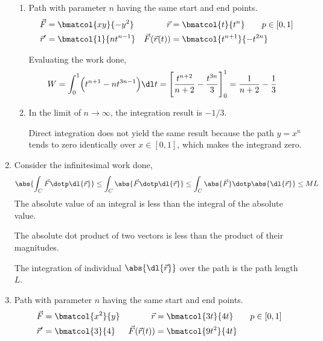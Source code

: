 \begin{enumerate}
\begin{enumerate}
              \item Path with parameter $ n $ having the same start and end points.
                    \begin{align}
                        \vec{F}             & = \bmatcol{xy}{-y^2}         &
                        \vec{r}             & =
                        \bmatcol{t}{t^n} \qquad p \in [0, 1]                 \\
                        \vec{r}'            & = \bmatcol{1}{n t^{n-1}}     &
                        \vec{F}(\vec{r}(t)) & = \bmatcol{t^{n+1}}{-t^{2n}}
                    \end{align}

                    Evaluating the work done,
                    \begin{align}
                        W & = \int_{0}^{1} \Bigl( t^{n+1} - nt^{3n-1}
                        \Bigr) \dl t = \Bigg[ \frac{t^{n+2}}{n+2}
                            - \frac{t^{3n}}{3} \Bigg]_0^1
                        = \frac{1}{n+2} - \frac{1}{3}
                    \end{align}

              \item In the limit of $ n \to \infty $, the integration result
                    is $ -1/3 $. \par
                    Direct integration does not yield the same result because the
                    path $ y = x^n $ tends to zero identically over $ x \in [0, 1] $,
                    which makes the integrand zero.
          \end{enumerate}

    \item Consider the infinitesimal work done,
          \begin{align}
              \abs{\int_{C} \vec{F} \dotp \dl{\vec{r}}} \leq
              \int_{C} \abs{\vec{F} \dotp \dl{\vec{r}}} \leq
              \int_{C} \abs{\vec{F}} \dotp \abs{\dl{\vec{r}}} \leq
              ML
          \end{align}
          The absolute value of an integral is less than the integral of the absolute
          value. \par
          The absolute dot product of two vectors is less than the product of their
          magnitudes. \par
          The integration of individual $ \abs{\dl{\vec{r}}} $ over the path is the
          path length $ L $.

    \item Path with parameter $ n $ having the same start and end points.
          \begin{align}
              \vec{F}             & = \bmatcol{x^2}{y}   &
              \vec{r}             & =
              \bmatcol{3t}{4t} \qquad p \in [0, 1]         \\
              \vec{r}'            & = \bmatcol{3}{4}     &
              \vec{F}(\vec{r}(t)) & = \bmatcol{9t^2}{4t}
          \end{align}


\end{enumerate}
